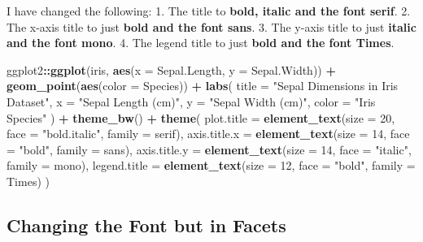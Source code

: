 \documentclass[
]{book}
\newenvironment{Shaded}{\begin{snugshade}}{\end{snugshade}}
\newcommand{\AttributeTok}[1]{\textcolor[rgb]{0.13,0.29,0.53}{#1}}
\newcommand{\DecValTok}[1]{\textcolor[rgb]{0.00,0.00,0.81}{#1}}
\newcommand{\FunctionTok}[1]{\textcolor[rgb]{0.13,0.29,0.53}{\textbf{#1}}}
\newcommand{\NormalTok}[1]{#1}
\newcommand{\SpecialCharTok}[1]{\textcolor[rgb]{0.81,0.36,0.00}{\textbf{#1}}}
\newcommand{\StringTok}[1]{\textcolor[rgb]{0.31,0.60,0.02}{#1}}
\begin{document}
I have changed the following:
1. The title to \textbf{bold, italic and the font serif}.
2. The x-axis title to just \textbf{bold and the font sans}.
3. The y-axis title to just \textbf{italic and the font mono}.
4. The legend title to just \textbf{bold and the font Times}.

\begin{Shaded}
\begin{Highlighting}[]
\NormalTok{ggplot2}\SpecialCharTok{::}\FunctionTok{ggplot}\NormalTok{(iris, }\FunctionTok{aes}\NormalTok{(}\AttributeTok{x =}\NormalTok{ Sepal.Length, }\AttributeTok{y =}\NormalTok{ Sepal.Width)) }\SpecialCharTok{+}
  \FunctionTok{geom\_point}\NormalTok{(}\FunctionTok{aes}\NormalTok{(}\AttributeTok{color =}\NormalTok{ Species)) }\SpecialCharTok{+}
  \FunctionTok{labs}\NormalTok{(}
    \AttributeTok{title =} \StringTok{"Sepal Dimensions in Iris Dataset"}\NormalTok{,}
    \AttributeTok{x =} \StringTok{"Sepal Length (cm)"}\NormalTok{,}
    \AttributeTok{y =} \StringTok{"Sepal Width (cm)"}\NormalTok{,}
    \AttributeTok{color =} \StringTok{"Iris Species"}
\NormalTok{  ) }\SpecialCharTok{+}
  \FunctionTok{theme\_bw}\NormalTok{() }\SpecialCharTok{+}
  \FunctionTok{theme}\NormalTok{(}
    \AttributeTok{plot.title =} \FunctionTok{element\_text}\NormalTok{(}\AttributeTok{size =} \DecValTok{20}\NormalTok{, }\AttributeTok{face =} \StringTok{"bold.italic"}\NormalTok{, }\AttributeTok{family =} \StringTok{\textquotesingle{}serif\textquotesingle{}}\NormalTok{),}
    \AttributeTok{axis.title.x =} \FunctionTok{element\_text}\NormalTok{(}\AttributeTok{size =} \DecValTok{14}\NormalTok{, }\AttributeTok{face =} \StringTok{"bold"}\NormalTok{, }\AttributeTok{family =} \StringTok{\textquotesingle{}sans\textquotesingle{}}\NormalTok{),}
    \AttributeTok{axis.title.y =} \FunctionTok{element\_text}\NormalTok{(}\AttributeTok{size =} \DecValTok{14}\NormalTok{, }\AttributeTok{face =} \StringTok{"italic"}\NormalTok{, }\AttributeTok{family =} \StringTok{\textquotesingle{}mono\textquotesingle{}}\NormalTok{),}
    \AttributeTok{legend.title =} \FunctionTok{element\_text}\NormalTok{(}\AttributeTok{size =} \DecValTok{12}\NormalTok{, }\AttributeTok{face =} \StringTok{"bold"}\NormalTok{, }\AttributeTok{family =} \StringTok{\textquotesingle{}Times\textquotesingle{}}\NormalTok{)}
\NormalTok{  )}
\end{Highlighting}
\end{Shaded}

\subsection{Changing the Font but in Facets}\label{changing-the-font-but-in-facets}
\end{document}
